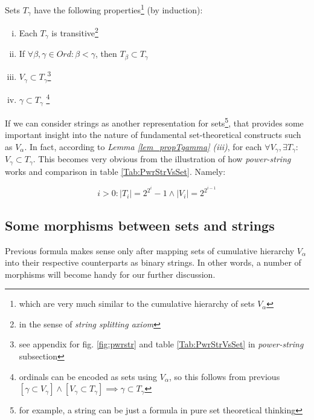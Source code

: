 \begin{lemma}\label{lem_propTgamma}
  Sets $T_\gamma$ have the following properties\footnote{which are very much similar to the cumulative hierarchy of sets $V_\alpha$} (by induction):
  \begin{enumerate}[i.)]
    \item Each $T_\gamma$ is transitive\footnote{in the sense of \textit{string splitting axiom}}
    \item If $\forall \beta, \gamma \in Ord: \beta < \gamma$, then $T_\beta \subset T_\gamma$
    \item $V_\gamma \subset T_\gamma$\footnote{see appendix for fig. \ref{fig:pwrstr} and table \ref{Tab:PwrStrVsSet} in \textit{power-string} subsection}
    \item $\gamma \subset T_\gamma$ \footnote{ordinals can be encoded as sets using $V_\alpha$, so this follows from previous $[\gamma \subset V_\gamma] \land [V_\gamma \subset T_\gamma] \implies \gamma \subset T_\gamma$}
  \end{enumerate}
\end{lemma}

If we can consider strings as another representation for sets\footnote{for example, a string can be just a formula in pure set theoretical thinking}, that provides some important insight into the nature of fundamental set-theoretical constructs such as $V_\alpha$. In fact, according to \textit{Lemma \ref{lem_propTgamma} (iii)}, for each $\forall V_\gamma, \exists T_\gamma$: $V_\gamma \subset T_\gamma$. This becomes very obvious from the illustration of how \textit{power-string} works and comparison in table \ref{Tab:PwrStrVsSet}. Namely:

\[  i>0:  |T_i| = 2^{2^{i}} - 1 \land  |V_i| = 2^{2^{i-1}}  \]

\subsection{Some morphisms between sets and strings}

Previous formula makes sense only after mapping sets of cumulative hierarchy $V_\alpha$ into their respective counterparts as binary strings. In other words, a number of morphisms will become handy for our further discussion.

